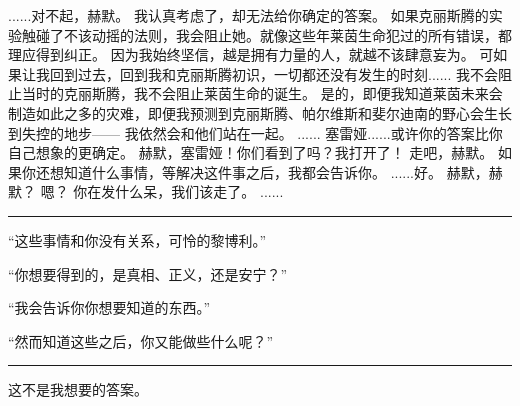 \documentclass[openany]{book}
\begin{document}
\begin{dialogue}
     ......对不起，赫默。
     我认真考虑了，却无法给你确定的答案。
     如果克丽斯腾的实验触碰了不该动摇的法则，我会阻止她。就像这些年莱茵生命犯过的所有错误，都理应得到纠正。
     因为我始终坚信，越是拥有力量的人，就越不该肆意妄为。
     可如果让我回到过去，回到我和克丽斯腾初识，一切都还没有发生的时刻......
     我不会阻止当时的克丽斯腾，我不会阻止莱茵生命的诞生。
     是的，即便我知道莱茵未来会制造如此之多的灾难，即便我预测到克丽斯腾、帕尔维斯和斐尔迪南的野心会生长到失控的地步——
     我依然会和他们站在一起。
     ......
     塞雷娅......或许你的答案比你自己想象的更确定。
     赫默，塞雷娅！你们看到了吗？我打开了！
     走吧，赫默。
     如果你还想知道什么事情，等解决这件事之后，我都会告诉你。
     ......好。
     赫默，赫默？
     嗯？
     你在发什么呆，我们该走了。
     ......
\end{dialogue}

\par\noindent\rule{\textwidth}{0.4pt}\par
“这些事情和你没有关系，可怜的黎博利。”\par
“你想要得到的，是真相、正义，还是安宁？”\par
“我会告诉你你想要知道的东西。”\par
“然而知道这些之后，你又能做些什么呢？”
\par\noindent\rule{\textwidth}{0.4pt}
这不是我想要的答案。
\end{document}
